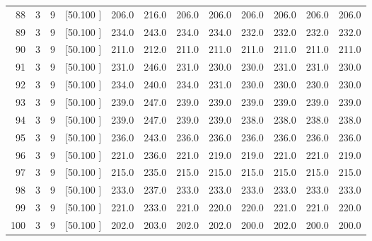 \documentclass[12pt,a4paper]{article}
\begin{document}
\begin{center}
{\begin{tabular}{r r r r r r r r r r r r}
  88&  3&  9&[50.100    ]&   206.0&   216.0&   206.0&   206.0&   206.0&   206.0&   206.0&   206.0\\[-0.02in]
  89&  3&  9&[50.100    ]&   234.0&   243.0&   234.0&   234.0&   232.0&   232.0&   232.0&   232.0\\[-0.02in]
  90&  3&  9&[50.100    ]&   211.0&   212.0&   211.0&   211.0&   211.0&   211.0&   211.0&   211.0\\[-0.02in]
  91&  3&  9&[50.100    ]&   231.0&   246.0&   231.0&   230.0&   230.0&   231.0&   231.0&   230.0\\[-0.02in]
  92&  3&  9&[50.100    ]&   234.0&   240.0&   234.0&   231.0&   230.0&   230.0&   230.0&   230.0\\[-0.02in]
  93&  3&  9&[50.100    ]&   239.0&   247.0&   239.0&   239.0&   239.0&   239.0&   239.0&   239.0\\[-0.02in]
  94&  3&  9&[50.100    ]&   239.0&   247.0&   239.0&   239.0&   238.0&   238.0&   238.0&   238.0\\[-0.02in]
  95&  3&  9&[50.100    ]&   236.0&   243.0&   236.0&   236.0&   236.0&   236.0&   236.0&   236.0\\[-0.02in]
  96&  3&  9&[50.100    ]&   221.0&   236.0&   221.0&   219.0&   219.0&   221.0&   221.0&   219.0\\[-0.02in]
  97&  3&  9&[50.100    ]&   215.0&   235.0&   215.0&   215.0&   215.0&   215.0&   215.0&   215.0\\[-0.02in]
  98&  3&  9&[50.100    ]&   233.0&   237.0&   233.0&   233.0&   233.0&   233.0&   233.0&   233.0\\[-0.02in]
  99&  3&  9&[50.100    ]&   221.0&   233.0&   221.0&   220.0&   220.0&   221.0&   221.0&   220.0\\[-0.02in]
 100&  3&  9&[50.100    ]&   202.0&   203.0&   202.0&   202.0&   200.0&   202.0&   200.0&   200.0\\[-0.02in]

\hline
\end{tabular}}
\end{center}
\end{document}

